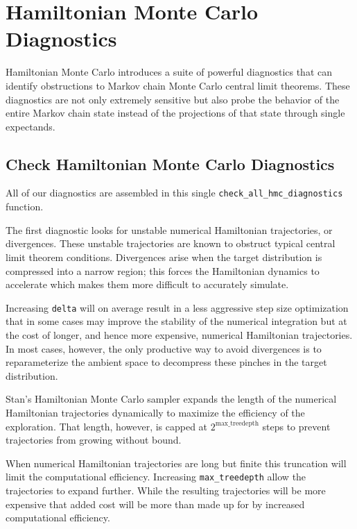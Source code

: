 \documentclass[
  letterpaper,
  DIV=11,
  numbers=noendperiod]{scrartcl}
\begin{document}
\section{Hamiltonian Monte Carlo
Diagnostics}\label{hamiltonian-monte-carlo-diagnostics}

Hamiltonian Monte Carlo introduces a suite of powerful diagnostics that
can identify obstructions to Markov chain Monte Carlo central limit
theorems. These diagnostics are not only extremely sensitive but also
probe the behavior of the entire Markov chain state instead of the
projections of that state through single expectands.

\subsection{Check Hamiltonian Monte Carlo
Diagnostics}\label{check-hamiltonian-monte-carlo-diagnostics}

All of our diagnostics are assembled in this single
\texttt{check\_all\_hmc\_diagnostics} function.

The first diagnostic looks for unstable numerical Hamiltonian
trajectories, or divergences. These unstable trajectories are known to
obstruct typical central limit theorem conditions. Divergences arise
when the target distribution is compressed into a narrow region; this
forces the Hamiltonian dynamics to accelerate which makes them more
difficult to accurately simulate.

Increasing \texttt{delta} will on average result in a less aggressive
step size optimization that in some cases may improve the stability of
the numerical integration but at the cost of longer, and hence more
expensive, numerical Hamiltonian trajectories. In most cases, however,
the only productive way to avoid divergences is to reparameterize the
ambient space to decompress these pinches in the target distribution.

Stan's Hamiltonian Monte Carlo sampler expands the length of the
numerical Hamiltonian trajectories dynamically to maximize the
efficiency of the exploration. That length, however, is capped at
\(2^{\text{max\_treedepth}}\) steps to prevent trajectories from growing
without bound.

When numerical Hamiltonian trajectories are long but finite this
truncation will limit the computational efficiency. Increasing
\texttt{max\_treedepth} allow the trajectories to expand further. While
the resulting trajectories will be more expensive that added cost will
be more than made up for by increased computational efficiency.
\end{document}

